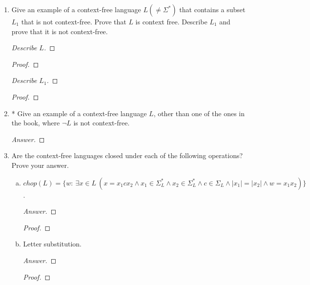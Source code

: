 \documentclass[10pt]{article}
\newcommand{\card}[1]{\left| #1 \right|}
\begin{document}
\begin{enumerate}[1)]
\begin{enumerate}[a)]
\item
\{$x\#y$ : $x, y \in \{0, 1\}^*$ and when $x$ and $y$ are viewed as binary numbers, $y = x^2$\}.  For example, the string 100\#10000 $\in L$.
\begin{proof}[Answer]
\end{proof}
\begin{proof}[Proof]
\end{proof}
\end{enumerate}


\item
Give an example of a context-free language $L(\neq \Sigma ^*)$ that contains a subset $L_1$ that is not context-free.  Prove that $L$ is context free.  Describe $L_1$ and prove that it is not context-free.
\begin{proof}[Describe $L$]
\end{proof}
\begin{proof}[Proof]
\end{proof}
\begin{proof}[Describe $L_1$]
\end{proof}
\begin{proof}[Proof]
\end{proof}


\item
*  Give an example of a context-free language  $L$, other than one of the ones in the book, where  $\lnot L$ is not context-free.
\begin{proof}[Answer]
\end{proof}



\item
Are the context-free languages closed under each of the following operations?  Prove your answer.
\begin{enumerate}[a)]
\item
$chop(L) = \{w:\ \exists x \in L\ (x = x_1cx_2 \land x_1 \in \Sigma _L^* \land x_2 \in \Sigma _L^* \land c \in \Sigma _L \land \card{x_1} = \card{x_2} \land w = x_1x_2)\}$.
\begin{proof}[Answer]
\end{proof}
\begin{proof}[Proof]
\end{proof}

\item
Letter substitution.
\begin{proof}[Answer]
\end{proof}
\begin{proof}[Proof]
\end{proof}
\end{enumerate}


\end{enumerate}
\end{document}
